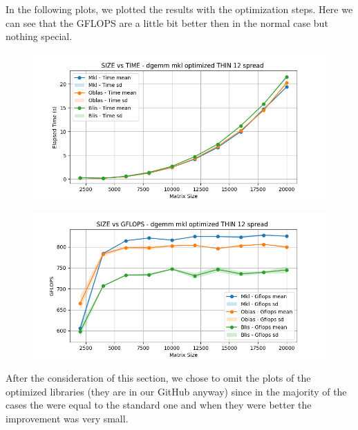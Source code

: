 \documentclass{article}
\begin{document}
In the following plots, we plotted the results with the optimization steps. Here we can see that the GFLOPS are a little bit better then in the normal case but nothing special.  

\begin{figure}[H]
    \centering
    \includegraphics[width=\textwidth]{THIN 12/dgemm_mkl_optimized_THIN_12_spread_time.png}
\end{figure}

\begin{figure}[H]
    \centering
    \includegraphics[width=\textwidth]{THIN 12/dgemm_mkl_optimized_THIN_12_spread_gflops.png}
\end{figure}

After the consideration of this section, we chose to omit the plots of the optimized libraries (they are in our GitHub anyway) since in the majority of the cases the were equal to the standard one and when they were better the improvement was very small.
\end{document}

